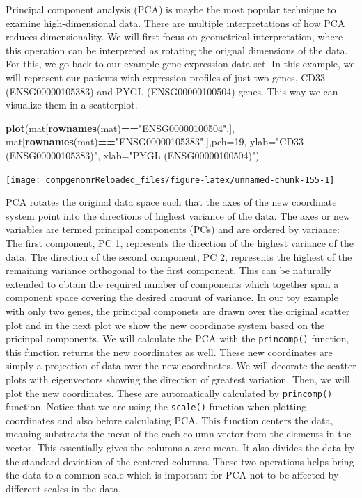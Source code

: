 \documentclass[12pt,]{krantz}
\newenvironment{Shaded}{\begin{snugshade}}{\end{snugshade}}
\newcommand{\DataTypeTok}[1]{\textcolor[rgb]{0.13,0.29,0.53}{#1}}
\newcommand{\DecValTok}[1]{\textcolor[rgb]{0.00,0.00,0.81}{#1}}
\newcommand{\KeywordTok}[1]{\textcolor[rgb]{0.13,0.29,0.53}{\textbf{#1}}}
\newcommand{\NormalTok}[1]{#1}
\newcommand{\OperatorTok}[1]{\textcolor[rgb]{0.81,0.36,0.00}{\textbf{#1}}}
\newcommand{\StringTok}[1]{\textcolor[rgb]{0.31,0.60,0.02}{#1}}
\theoremstyle{definition}
\theoremstyle{definition}
\theoremstyle{definition}
\theoremstyle{remark}
\begin{document}
Principal component analysis (PCA) is maybe the most popular technique
to examine high-dimensional data. There are multiple interpretations of
how PCA reduces dimensionality. We will first focus on geometrical
interpretation, where this operation can be interpreted as rotating the
orignal dimensions of the data. For this, we go back to our example gene
expression data set. In this example, we will represent our patients
with expression profiles of just two genes, CD33 (ENSG00000105383) and
PYGL (ENSG00000100504) genes. This way we can visualize them in a
scatterplot.

\begin{Shaded}
\begin{Highlighting}[]
\KeywordTok{plot}\NormalTok{(mat[}\KeywordTok{rownames}\NormalTok{(mat)}\OperatorTok{==}\StringTok{"ENSG00000100504"}\NormalTok{,],}
\NormalTok{     mat[}\KeywordTok{rownames}\NormalTok{(mat)}\OperatorTok{==}\StringTok{"ENSG00000105383"}\NormalTok{,],}\DataTypeTok{pch=}\DecValTok{19}\NormalTok{,}
     \DataTypeTok{ylab=}\StringTok{"CD33 (ENSG00000105383)"}\NormalTok{,}
     \DataTypeTok{xlab=}\StringTok{"PYGL (ENSG00000100504)"}\NormalTok{)}
\end{Highlighting}
\end{Shaded}

\begin{center}\texttt{[image: compgenomrReloaded\_files/figure-latex/unnamed-chunk-155-1]} \end{center}

PCA rotates the original data space such that the axes of the new
coordinate system point into the directions of highest variance of the
data. The axes or new variables are termed principal components (PCs)
and are ordered by variance: The first component, PC 1, represents the
direction of the highest variance of the data. The direction of the
second component, PC 2, represents the highest of the remaining variance
orthogonal to the first component. This can be naturally extended to
obtain the required number of components which together span a component
space covering the desired amount of variance. In our toy example with
only two genes, the principal componets are drawn over the original
scatter plot and in the next plot we show the new coordinate system
based on the pricinpal components. We will calculate the PCA with the
\texttt{princomp()} function, this function returns the new coordinates
as well. These new coordinates are simply a projection of data over the
new coordinates. We will decorate the scatter plots with eigenvectors
showing the direction of greatest variation. Then, we will plot the new
coordinates. These are automatically calculated by \texttt{princomp()}
function. Notice that we are using the \texttt{scale()} function when
plotting coordinates and also before calculating PCA. This function
centers the data, meaning substracts the mean of the each column vector
from the elements in the vector. This essentially gives the columns a
zero mean. It also divides the data by the standard deviation of the
centered columns. These two operations helps bring the data to a common
scale which is important for PCA not to be affected by different scales
in the data.
\end{document}
